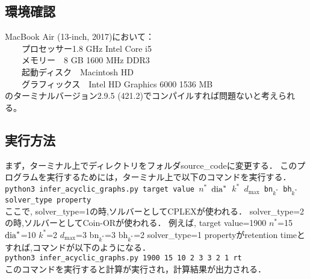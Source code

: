 \documentclass[11pt,titlepage,dvipdfmx,twoside]{jarticle}
\begin{document}
\subsection{環境確認}
MacBook Air (13-inch, 2017)において：\\
~~~~プロセッサー1.8 GHz Intel Core i5\\
~~~~メモリー　8 GB 1600 MHz DDR3\\
~~~~起動ディスク　Macintosh HD\\
~~~~グラフィックス　Intel HD Graphics 6000 1536 MB\\
のターミナルバージョン2.9.5 (421.2)でコンパイルすれば問題ないと考えられる。


\subsection{実行方法}
\label{sec:Exp_1}

まず，ターミナル上でディレクトリをフォルダsource\_codeに変更する．
このプログラムを実行するためには，ターミナル上で以下のコマンドを実行する．\\

{\tt python3 infer\_acyclic\_graphs.py target value 
$n^\ast$ ${\rm dia}^\ast$ $k^\ast$ $d_{\max}$ bn$_{k^\ast}$  bh$_{k^\ast}$ solver\_type property}\\

ここで, solver\_type=1の時,ソルバーとしてCPLEXが使われる． solver\_type=2の時,ソルバーとしてCoin-ORが使われる．
例えば,
target value=1900 $n^\ast$=15 ${\rm dia}^\ast$=10 $k^\ast$=2 $d_{\max}$=3 bn$_{k^\ast}$=3 bh$_{k^\ast}$=2 solver\_type=1  
propertyがretention timeとすれば,コマンドが以下のようになる．\\

{\tt python3 infer\_acyclic\_graphs.py 1900 15 10 2 3 3 2 1 rt}\\

このコマンドを実行すると計算が実行され，計算結果が出力される．
\end{document}
